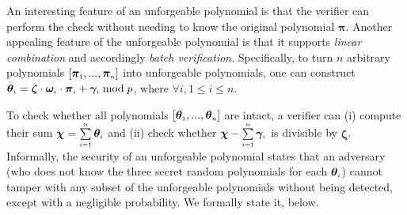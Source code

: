  An interesting feature of an unforgeable polynomial is that the verifier can perform the check without needing to know the original polynomial $\bm\pi$. Another appealing feature of the unforgeable polynomial is that it supports \emph{linear combination} and accordingly \emph{batch verification}. Specifically, to turn $n$ arbitrary polynomials $[\bm\pi_{\scriptscriptstyle 1},..., \bm\pi_{\scriptscriptstyle n}]$ into unforgeable polynomials, one can construct  $\bm\theta_{\scriptscriptstyle i}=\bm\zeta\cdot \bm\omega_{\scriptscriptstyle i}\cdot \bm\pi_{\scriptscriptstyle i}+ \bm\gamma_{\scriptscriptstyle i} \bmod p$, where $\forall i, 1\leq i\leq n$.  
 
 

 
To check whether all polynomials $[\bm\theta_{\scriptscriptstyle 1},..., \bm\theta_{\scriptscriptstyle n}]$ are intact, a verifier can (i) compute their sum $\bm \chi=\sum\limits_{\scriptscriptstyle i=1}^{\scriptscriptstyle n}\bm\theta_{\scriptscriptstyle i}$ and (ii) check whether $\bm \chi- \sum\limits_{\scriptscriptstyle i=1}^{\scriptscriptstyle n}\bm\gamma_{\scriptscriptstyle i} $ is divisible by $\bm \zeta$.  Informally, the security of an unforgeable polynomial states that an adversary (who does not know the three secret random polynomials for each $\bm\theta_{\scriptscriptstyle i}$) cannot tamper with any subset of the unforgeable polynomials without being detected, except with a negligible probability. We formally state it, below. 
 
 

